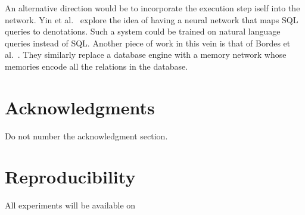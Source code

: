 \documentclass[11pt,letterpaper]{article}
\begin{document}
An alternative direction would be to incorporate the execution
step iself into the network.  Yin et al.~
explore the idea of having a neural network that maps
SQL queries to denotations.  Such a system could be trained
on natural language queries instead of SQL.
Another piece of work in this vein is 
that of Bordes et al.~.
They similarly replace a database engine with a memory network
whose memories encode all the relations in the database.

\section*{Acknowledgments}
Do not number the acknowledgment section.

\section*{Reproducibility}
All experiments will be available on 



\end{document}
